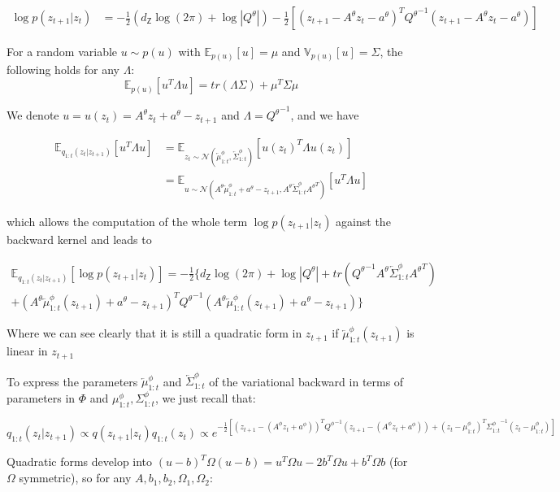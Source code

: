 \documentclass{article}
\newcommand{\1}{\mathbbm{1}}
\newcommand{\expect}[2]{\mathbb{E}_{#1}\left[#2\right]}
\newcommand{\gaussian}[2]{\mathcal{N}\left( #1, #2 \right)}
\newcommand{\backward}[1]{\overleftarrow{#1}}
\newcommand{\vbackward}[1]{q_{1:#1}(z_{#1}|z_{#1 + 1})}
\newcommand{\vfilt}[1]{q_{1:#1}(z_{#1})}
\newcommand{\vbackwardparam}[2]{\backward{#1}_{1:#2}^\phi}
\newcommand{\vbackwardmean}[1]{\vbackwardparam{\mu}{#1}}
\newcommand{\vbackwardcov}[1]{\vbackwardparam{\Sigma}{#1}}
\newcommand{\vfiltparam}[2]{#1_{1:#2}^\phi}
\newcommand{\vfiltmean}[1]{\vfiltparam{\mu}{#1}}
\newcommand{\vfiltcov}[1]{\vfiltparam{\Sigma}{#1}}
\newcommand{\inv}[1]{{#1}^{-1}}
\newcommand{\stateprec}{\inv{Q^\theta}}
\newcommand{\vstateprec}{\inv{Q^\phi}}
\newcommand{\quadform}[2]{#1^T #2 #1}
\begin{document}
\begin{align}
    \log p(z_{t+1}|z_t) &= -\frac{1}{2}\left(d_\mathsf{Z} \log(2\pi) + \log |Q^\theta|\right) - \frac{1}{2}\left[\quadform{(z_{t+1} - A^\theta z_t - a^\theta)}{\stateprec}\right]
\end{align}

For a random variable $u \sim p(u)$ with $\expect{p(u)}{u} = \mu$ and $\mathbb{V}_{p(u)}[u] = \Sigma$, the following holds for any $\Lambda$:
$$\expect{p(u)}{u^T \Lambda u} = tr(\Lambda \Sigma) + \mu^T \Sigma \mu$$

We denote $u = u(z_t) = A^\theta z_t + a^\theta - z_{t+1}$ and $\Lambda = \stateprec$, and we have

\begin{align*}
    \expect{\vbackward{t}}{u^T \Lambda u} &= \expect{z_t \sim \gaussian{\vbackwardmean{t}}{\vbackwardcov{t}}}{u(z_t)^T \Lambda u(z_t)} \\
    &=  \expect{u \sim \gaussian{A^\theta \vbackwardmean{t} + a^\theta - z_{t+1}}{A^\theta \vbackwardcov{t} {A^\theta}^T}}{u^T \Lambda u}
\end{align*}


which allows the computation of the whole term $\log p(z_{t+1}|z_t)$ against the backward kernel and leads to

\begin{multline*}
    \expect{\vbackward{t}}{\log p(z_{t+1}|z_t)} = -\frac{1}{2}\{d_\mathsf{Z} \log(2\pi) + \log |Q^\theta| + tr(\stateprec A^\theta \vbackwardcov{t} {A^\theta}^T) \\
     + \quadform{(A^\theta \vbackwardmean{t}(z_{t+1}) + a^\theta - z_{t+1})}{\stateprec}\} 
\end{multline*}

Where we can see clearly that it is still a quadratic form in $z_{t+1}$ if $\vbackwardmean{t}(z_{t+1})$ is linear in $z_{t+1}$

To express the parameters $\vbackwardmean{t}$ and $\vbackwardcov{t}$ of the variational backward in terms of parameters in $\Phi$ and $\vfiltmean{t},\vfiltcov{t}$, we just recall that: 

\begin{equation*}
    \vbackward{t} \propto q(z_{t+1}|z_t) \vfilt{t} \propto e^{-\frac{1}{2}\left[\quadform{\left(z_{t+1} - (A^\phi z_t + a^\phi)\right)}{\vstateprec} + \quadform{(z_t - \vfiltmean{t})}{\inv{\vfiltcov{t}}} \right]}
\end{equation*}

Quadratic forms develop into $\quadform{(u-b)}{\Omega} = \quadform{u}{\Omega} - 2b^T \Omega u +b^T \Omega b$ (for $\Omega$ symmetric), so for any $A,b_1,b_2,\Omega_1, \Omega_2$:
\end{document}
